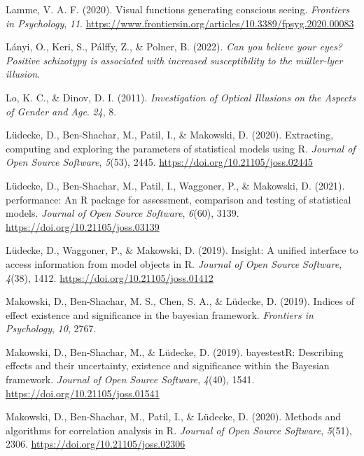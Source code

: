 \documentclass[
  man,floatsintext]{apa6}
\newlength{\cslhangindent}
\newlength{\cslentryspacingunit} %
\newenvironment{CSLReferences}[2] %
 {%
  \setlength{\parindent}{0pt}
  \ifodd #1
  \let\oldpar\par
  \def\par{\hangindent=\cslhangindent\oldpar}
  \fi
  \setlength{\parskip}{#2\cslentryspacingunit}
 }%
 {}
\begin{document}
\begin{CSLReferences}{1}{0}
\leavevmode{}%
Lamme, V. A. F. (2020). Visual functions generating conscious seeing. \emph{Frontiers in Psychology}, \emph{11}. \url{https://www.frontiersin.org/articles/10.3389/fpsyg.2020.00083}

\leavevmode{}%
Lányi, O., Keri, S., Pálffy, Z., \& Polner, B. (2022). \emph{Can you believe your eyes? Positive schizotypy is associated with increased susceptibility to the m{ü}ller-lyer illusion}.

\leavevmode{}%
Lo, K. C., \& Dinov, D. I. (2011). \emph{Investigation of Optical Illusions on the Aspects of Gender and Age}. \emph{24}, 8.

\leavevmode{}%
Lüdecke, D., Ben-Shachar, M., Patil, I., \& Makowski, D. (2020). Extracting, computing and exploring the parameters of statistical models using {R}. \emph{Journal of Open Source Software}, \emph{5}(53), 2445. \url{https://doi.org/10.21105/joss.02445}

\leavevmode{}%
Lüdecke, D., Ben-Shachar, M., Patil, I., Waggoner, P., \& Makowski, D. (2021). {performance}: An {R} package for assessment, comparison and testing of statistical models. \emph{Journal of Open Source Software}, \emph{6}(60), 3139. \url{https://doi.org/10.21105/joss.03139}

\leavevmode{}%
Lüdecke, D., Waggoner, P., \& Makowski, D. (2019). Insight: A unified interface to access information from model objects in {R}. \emph{Journal of Open Source Software}, \emph{4}(38), 1412. \url{https://doi.org/10.21105/joss.01412}

\leavevmode{}%
Makowski, D., Ben-Shachar, M. S., Chen, S. A., \& Lüdecke, D. (2019). Indices of effect existence and significance in the bayesian framework. \emph{Frontiers in Psychology}, \emph{10}, 2767.

\leavevmode{}%
Makowski, D., Ben-Shachar, M., \& Lüdecke, D. (2019). {bayestestR}: Describing effects and their uncertainty, existence and significance within the {Bayesian} framework. \emph{Journal of Open Source Software}, \emph{4}(40), 1541. \url{https://doi.org/10.21105/joss.01541}

\leavevmode{}%
Makowski, D., Ben-Shachar, M., Patil, I., \& Lüdecke, D. (2020). Methods and algorithms for correlation analysis in {R}. \emph{Journal of Open Source Software}, \emph{5}(51), 2306. \url{https://doi.org/10.21105/joss.02306}


\end{CSLReferences}
\end{document}
